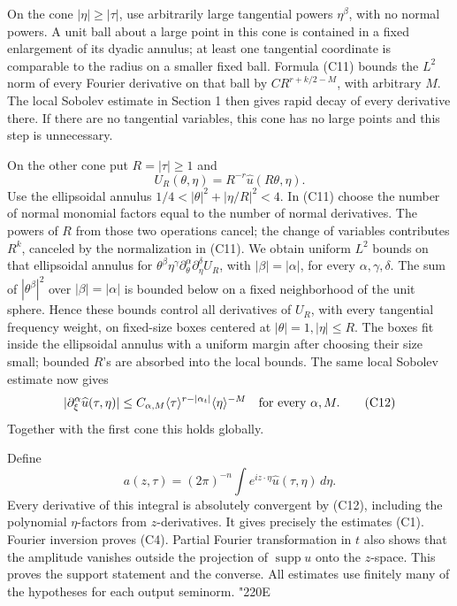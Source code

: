 \documentclass[
  11pt,
]{article}
\begin{document}
On the cone \(|\eta|\geq|\tau|\), use arbitrarily large tangential
powers \(\eta^\beta\), with no normal powers. A unit ball about a large
point in this cone is contained in a fixed enlargement of its dyadic
annulus; at least one tangential coordinate is comparable to the radius
on a smaller fixed ball. Formula (C11) bounds the \(L^2\) norm of every
Fourier derivative on that ball by \(C R^{r+k/2-M}\), with arbitrary
\(M\). The local Sobolev estimate in Section 1 then gives rapid decay of
every derivative there. If there are no tangential variables, this cone
has no large points and this step is unnecessary.

On the other cone put \(R=|\tau|\geq1\) and \[
U_R(\theta,\eta)=R^{-r}\widehat u(R\theta,\eta).
\] Use the ellipsoidal annulus \(1/4<|\theta|^2+|\eta/R|^2<4\). In (C11)
choose the number of normal monomial factors equal to the number of
normal derivatives. The powers of \(R\) from those two operations
cancel; the change of variables contributes \(R^k\), canceled by the
normalization in (C11). We obtain uniform \(L^2\) bounds on that
ellipsoidal annulus for
\(\theta^\beta\eta^\gamma\partial_\theta^\alpha\partial_\eta^\delta U_R\),
with \(|\beta|=|\alpha|\), for every \(\alpha,\gamma,\delta\). The sum
of \(|\theta^\beta|^2\) over \(|\beta|=|\alpha|\) is bounded below on a
fixed neighborhood of the unit sphere. Hence these bounds control all
derivatives of \(U_R\), with every tangential frequency weight, on
fixed-size boxes centered at \(|\theta|=1,|\eta|\leq R\). The boxes fit
inside the ellipsoidal annulus with a uniform margin after choosing
their size small; bounded \(R\)'s are absorbed into the local bounds.
The same local Sobolev estimate now gives \[
|\partial_\xi^\alpha\widehat u(\tau,\eta)|
\leq C_{\alpha,M}\langle\tau\rangle^{r-|\alpha_t|}
\langle\eta\rangle^{-M}
\quad\hbox{for every }\alpha,M.
\tag{C12}
\] Together with the first cone this holds globally.

Define \[
a(z,\tau)=(2\pi)^{-n}\int e^{iz\cdot\eta}\widehat u(\tau,\eta)\,d\eta.
\tag{C13}
\] Every derivative of this integral is absolutely convergent by (C12),
including the polynomial \(\eta\)-factors from \(z\)-derivatives. It
gives precisely the estimates (C1). Fourier inversion proves (C4).
Partial Fourier transformation in \(t\) also shows that the amplitude
vanishes outside the projection of \(\operatorname{supp}u\) onto the
\(z\)-space. This proves the support statement and the converse. All
estimates use finitely many of the hypotheses for each output seminorm.
{\ReaderSymbols\char"220E}
\end{document}

